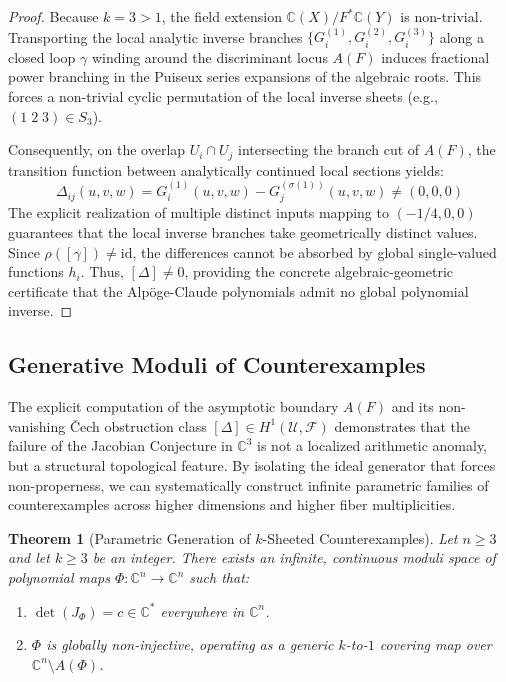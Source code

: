 \documentclass[11pt,reqno]{amsart}
\newtheorem{theorem}{Theorem}[section]
\theoremstyle{definition}
\begin{document}
\begin{proof}
Because $k = 3 > 1$, the field extension $\mathbb{C}(X) / F^*\mathbb{C}(Y)$ is non-trivial. Transporting the local analytic inverse branches $\{G_i^{(1)}, G_i^{(2)}, G_i^{(3)}\}$ along a closed loop $\gamma$ winding around the discriminant locus $A(F)$ induces fractional power branching in the Puiseux series expansions of the algebraic roots. This forces a non-trivial cyclic permutation of the local inverse sheets (e.g., $(1 \; 2 \; 3) \in S_3$).

Consequently, on the overlap $U_i \cap U_j$ intersecting the branch cut of $A(F)$, the transition function between analytically continued local sections yields:
$$\Delta_{ij}(u,v,w) = G_i^{(1)}(u,v,w) - G_j^{(\sigma(1))}(u,v,w) \neq (0,0,0)$$
The explicit realization of multiple distinct inputs mapping to $(-1/4, 0, 0)$ guarantees that the local inverse branches take geometrically distinct values. Since $\rho([\gamma]) \neq \mathrm{id}$, the differences cannot be absorbed by global single-valued functions $h_i$. Thus, $[\Delta] \neq 0$, providing the concrete algebraic-geometric certificate that the Alp\"oge-Claude polynomials admit no global polynomial inverse.
\end{proof}

\subsection{Generative Moduli of Counterexamples}
The explicit computation of the asymptotic boundary $A(F)$ and its non-vanishing \v{C}ech obstruction class $[\Delta] \in H^1(\mathcal{U}, \mathcal{F})$ demonstrates that the failure of the Jacobian Conjecture in $\mathbb{C}^3$ is not a localized arithmetic anomaly, but a structural topological feature. By isolating the ideal generator that forces non-properness, we can systematically construct infinite parametric families of counterexamples across higher dimensions and higher fiber multiplicities.

\begin{theorem}[Parametric Generation of $k$-Sheeted Counterexamples]
Let $n \ge 3$ and let $k \ge 3$ be an integer. There exists an infinite, continuous moduli space of polynomial maps $\Phi: \mathbb{C}^n \to \mathbb{C}^n$ such that:
\begin{enumerate}
    \item $\det(J_\Phi) = c \in \mathbb{C}^*$ everywhere in $\mathbb{C}^n$.
    \item $\Phi$ is globally non-injective, operating as a generic $k$-to-$1$ covering map over $\mathbb{C}^n \setminus A(\Phi)$.
\end{enumerate}
\end{theorem}
\end{document}
